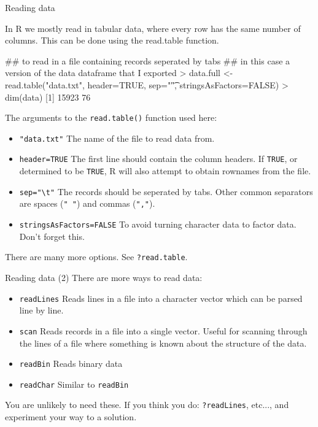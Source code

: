 \documentclass[pdf]{beamer}
\begin{document}
\begin{frame}[fragile]{Reading data}

  {\small
  In R we mostly read in tabular data, where every row has the
  same number of columns. This can be done using the read.table
  function.
  }
  
  \begin{rcode}
    ## to read in a file containing records seperated by tabs
    ## in this case a version of the data dataframe that I exported
    > data.full <- read.table("data.txt", header=TRUE, sep="\t", stringsAsFactors=FALSE)
    > dim(data)
    [1] 15923    76
  \end{rcode}
  
  {\footnotesize
    The arguments to the \texttt{read.table()} function used here:
    \begin{itemize}
    \item \texttt{"data.txt"} The name of the file to read data from.
    \item \texttt{header=TRUE} The first line should contain the column
      headers. If \texttt{TRUE}, or determined to be \texttt{TRUE}, R will 
      also attempt to obtain
      rownames from the file.
    \item \verb|sep="\t"| The records should be seperated by tabs. Other
      common separators are spaces (\texttt{" "}) and commas (\texttt{","}).
    \item \texttt{stringsAsFactors=FALSE} To avoid turning character data
      to factor data. Don't forget this.
    \end{itemize}

    There are many more options. See \texttt{?read.table}.
    }

\end{frame}

\begin{frame}[fragile]{Reading data (2)}
  There are more ways to read data:
  \begin{itemize}
    \item \texttt{readLines} Reads lines in a file into a character vector which
      can be parsed line by line.
    \item \texttt{scan} Reads records in a file into a single vector. Useful
      for scanning through the lines of a file where something is known about
      the structure of the data.
    \item \texttt{readBin} Reads binary data
    \item \texttt{readChar} Similar to \texttt{readBin}
  \end{itemize}
  
  You are unlikely to need these. If you think you do: \texttt{?readLines},
  etc..., and experiment your way to a solution.
\end{frame}
\end{document}
